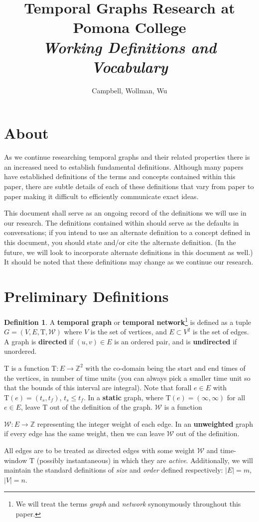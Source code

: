 \documentclass{article}
\title{Temporal Graphs Research at Pomona College\\
  \textit{Working Definitions and Vocabulary}
}
\author{Campbell, Wollman, Wu}
\theoremstyle{definition}
\newtheorem{defn}[thm]{Definition}
\numberwithin{thm}{subsection}
\newcommand{\W}{\mathcal{W}}
\newcommand{\Z}{\mathbb{Z}}
\newcommand{\T}{\text{T}}
\begin{document}
\maketitle

\section{About}

As we continue researching temporal graphs and their related properties there is
an increased need to establish fundamental definitions. Although many papers
have established definitions of the terms and concepts contained within this
paper, there are subtle details of each of these definitions that vary from
paper to paper making it difficult to efficiently communicate exact ideas.

This document shall serve as an ongoing record of the definitions we will use
in our research. The definitions contained within should serve as the defaults
in conversations; if you intend to use an alternate definition to a concept
defined in this document, you should state and/or cite the alternate definition.
(In the future, we will look to incorporate alternate definitions in this
document as well.) It should be noted that these definitions may change as we
continue our research.

\section{Preliminary Definitions}

\begin{defn}
  A \textbf{temporal graph} or \textbf{temporal network}\footnote{We will treat
  the terms \textit{graph} and \textit{network} synonymously throughout this
  paper.} is defined as a tuple $G = (V,E,\T,\W)$ where $V$ is the set of
  vertices, and $E \subset V^2$ is the set of edges. A graph is \textbf{directed} if
  $(u,v) \in E$ is an ordered pair, and is \textbf{undirected} if unordered.

  $\T$ is a function $\T : E \to \Z^2$ with the co-domain being the start and
  end times of the vertices, in number of time units (you can always pick a
  smaller time unit so that the bounds of this interval are integral). Note that
  forall $e \in E$ with $\T(e) = (t_s, t_f)$, $t_s \leq t_f$. In a
  \textbf{static} graph, where $\T(e) = (\infty, \infty)$ for all $e \in E$,
  leave $\T$ out of the definition of the graph. $\W$ is a function

  $\W : E \to \Z$ representing the integer weight of each edge. In an
  \textbf{unweighted} graph if every edge has the same weight, then we can
  leave $\W$ out of the definition.

  All edges are to be treated as directed edges with some weight $\W$ and
  time-window $\T$ (possibly instantaneous) in which they are \textit{active}.
  Additionally, we will maintain the standard definitions of \textit{size} and
  \textit{order} defined respectively: $|E| = m$,  $|V| = n$.
\end{defn}
\end{document}

